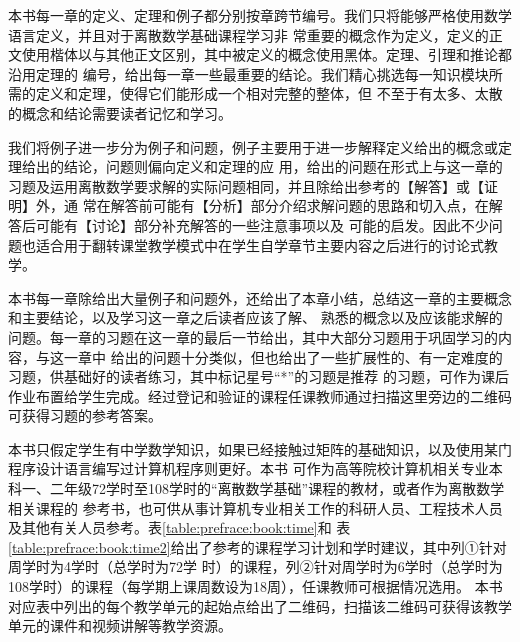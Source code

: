 本书每一章的定义、定理和例子都分别按章跨节编号。我们只将能够严格使用数学语言定义，并且对于离散数学基础课程学习非
常重要的概念作为定义，定义的正文使用楷体以与其他正文区别，其中被定义的概念使用黑体。定理、引理和推论都沿用定理的
编号，给出每一章一些最重要的结论。我们精心挑选每一知识模块所需的定义和定理，使得它们能形成一个相对完整的整体，但
不至于有太多、太散的概念和结论需要读者记忆和学习。

我们将例子进一步分为例子和问题，例子主要用于进一步解释定义给出的概念或定理给出的结论，问题则偏向定义和定理的应
用，给出的问题在形式上与这一章的习题及运用离散数学要求解的实际问题相同，并且除给出参考的【解答】或【证明】外，通
常在解答前可能有【分析】部分介绍求解问题的思路和切入点，在解答后可能有【讨论】部分补充解答的一些注意事项以及
可能的启发。因此不少问题也适合用于翻转课堂教学模式中在学生自学章节主要内容之后进行的讨论式教学。

\begin{window}
本书每一章除给出大量例子和问题外，还给出了本章小结，总结这一章的主要概念和主要结论，以及学习这一章之后读者应该了解、
熟悉的概念以及应该能求解的问题。每一章的习题在这一章的最后一节给出，其中大部分习题用于巩固学习的内容，与这一章中
给出的问题十分类似，但也给出了一些扩展性的、有一定难度的习题，供基础好的读者练习，其中标记星号``*''的习题是推荐
的习题，可作为课后作业布置给学生完成。经过登记和验证的课程任课教师通过扫描这里旁边的二维码可获得习题的参考答案。
\end{window}

本书只假定学生有中学数学知识，如果已经接触过矩阵的基础知识，以及使用某门程序设计语言编写过计算机程序则更好。本书
可作为高等院校计算机相关专业本科一、二年级72学时至108学时的“离散数学基础”课程的教材，或者作为离散数学相关课程的
参考书，也可供从事计算机专业相关工作的科研人员、工程技术人员及其他有关人员参考。表\ref{table:prefrace:book:time}和
表\ref{table:prefrace:book:time2}给出了参考的课程学习计划和学时建议，其中列①针对周学时为4学时（总学时为72学
时）的课程，列②针对周学时为6学时（总学时为108学时）的课程（每学期上课周数设为18周），任课教师可根据情况选用。
本书对应表中列出的每个教学单元的起始点给出了二维码，扫描该二维码可获得该教学单元的课件和视频讲解等教学资源。

